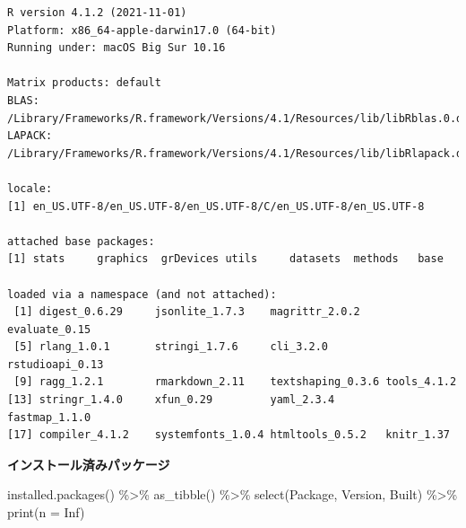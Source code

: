 \documentclass[
  a4paper,
  pandoc,
  ja=standard,
  jafont=haranoaji]{bxjsbook}
\newenvironment{Shaded}{\begin{snugshade}}{\end{snugshade}}
\newcommand{\AttributeTok}[1]{\textcolor[rgb]{0.00,0.48,0.65}{#1}}
\newcommand{\ConstantTok}[1]{\textcolor[rgb]{0.56,0.35,0.01}{#1}}
\newcommand{\FunctionTok}[1]{\textcolor[rgb]{0.28,0.35,0.67}{#1}}
\newcommand{\NormalTok}[1]{\textcolor[rgb]{0.00,0.48,0.65}{#1}}
\newcommand{\SpecialCharTok}[1]{\textcolor[rgb]{0.37,0.37,0.37}{#1}}
\begin{document}
\begin{verbatim}
R version 4.1.2 (2021-11-01)
Platform: x86_64-apple-darwin17.0 (64-bit)
Running under: macOS Big Sur 10.16

Matrix products: default
BLAS:   /Library/Frameworks/R.framework/Versions/4.1/Resources/lib/libRblas.0.dylib
LAPACK: /Library/Frameworks/R.framework/Versions/4.1/Resources/lib/libRlapack.dylib

locale:
[1] en_US.UTF-8/en_US.UTF-8/en_US.UTF-8/C/en_US.UTF-8/en_US.UTF-8

attached base packages:
[1] stats     graphics  grDevices utils     datasets  methods   base     

loaded via a namespace (and not attached):
 [1] digest_0.6.29     jsonlite_1.7.3    magrittr_2.0.2    evaluate_0.15    
 [5] rlang_1.0.1       stringi_1.7.6     cli_3.2.0         rstudioapi_0.13  
 [9] ragg_1.2.1        rmarkdown_2.11    textshaping_0.3.6 tools_4.1.2      
[13] stringr_1.4.0     xfun_0.29         yaml_2.3.4        fastmap_1.1.0    
[17] compiler_4.1.2    systemfonts_1.0.4 htmltools_0.5.2   knitr_1.37       
\end{verbatim}

\textbf{インストール済みパッケージ}

\begin{Shaded}
\begin{Highlighting}[]
\FunctionTok{installed.packages}\NormalTok{() }\SpecialCharTok{\%\textgreater{}\%}
  \FunctionTok{as\_tibble}\NormalTok{() }\SpecialCharTok{\%\textgreater{}\%}
  \FunctionTok{select}\NormalTok{(Package, Version, Built) }\SpecialCharTok{\%\textgreater{}\%}
  \FunctionTok{print}\NormalTok{(}\AttributeTok{n =} \ConstantTok{Inf}\NormalTok{)}
\end{Highlighting}
\end{Shaded}
\end{document}
